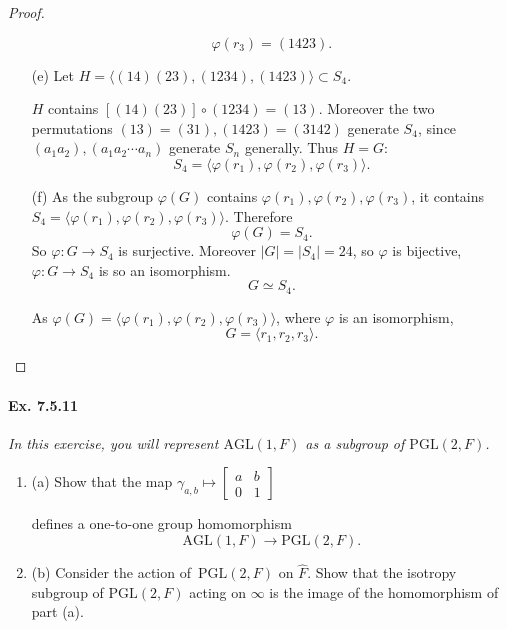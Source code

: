 \documentclass[11pt,a4paper]{article}
\newcommand{\be} {\begin{enumerate}}
\newcommand{\ee} {\end{enumerate}}
\begin{document}
\begin{proof}
\begin{enumerate}
$$\varphi(r_3) = (1 4 2 3).$$

\item[(e)] Let $H = \langle (1 4)(2 3), (1 2 3 4), (1 4 2 3) \rangle \subset S_4$.

$H$ contains $[(1 4)(2 3)] \circ (1 2 3 4 ) = (1 3)$. Moreover the two permutations $(1 3) = ( 3 1), (1 4 2 3) = (3 1 4 2)$ generate $S_4$, since $(a_1 a_2), (a_1 a_2 \cdots a_n)$ generate $S_n$ generally. Thus $H = G$:
$$S_4 = \langle \varphi(r_1), \varphi(r_2), \varphi(r_3) \rangle.$$

\item[(f)] 
As the subgroup $\varphi(G)$ contains $\varphi(r_1), \varphi(r_2), \varphi(r_3)$, it contains $S_4 = \langle \varphi(r_1), \varphi(r_2), \varphi(r_3) \rangle$. Therefore
$$\varphi(G) = S_4.$$
So $\varphi : G \to S_4$ is surjective. Moreover $\vert G \vert = \vert S_4 \vert = 24$, so $\varphi$ is bijective, $\varphi :G \to S_4$ is so an isomorphism.
$$G \simeq S_4.$$

As $\varphi(G) = \langle \varphi(r_1), \varphi(r_2), \varphi(r_3) \rangle$, where $\varphi$  is an isomorphism,
$$G = \langle r_1,r_2,r_3 \rangle.$$
\end{enumerate}
\end{proof}

\paragraph{Ex. 7.5.11}

{\it In this exercise, you will represent $\mathrm{AGL}(1,F)$ as a subgroup of $\mathrm{PGL}(2,F)$.
\be
\item[(a)] Show that the map $\gamma_{a,b} \mapsto  \left[
\begin{array}{ccc}
 a &   b   \\
  0&   1      
\end{array}
\right] $

defines a one-to-one group homomorphism
$$\mathrm{AGL}(1,F) \to \mathrm{PGL}(2,F).$$
\item[(b)] Consider the action of $\, \mathrm{PGL}(2,F)$ on $\hat{F}$. Show that the isotropy subgroup of $\mathrm{PGL}(2,F)$ acting on $\infty$ is the image of the homomorphism of part (a).
\ee
}
\end{document}
